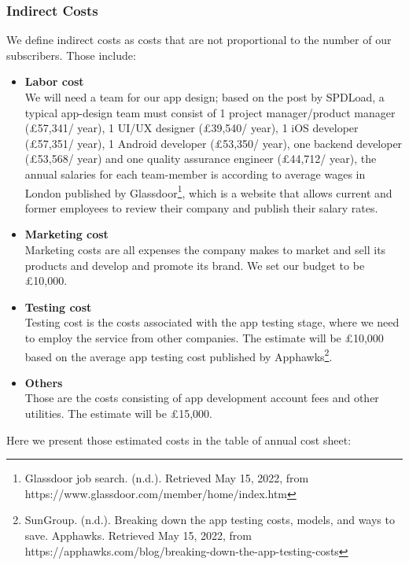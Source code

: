 \subsubsection{Indirect Costs}
We define indirect costs as costs that are not proportional to the number of our subscribers. Those include:
\begin{itemize}
\item \textbf{Labor cost}
\\We will need a team for our app design; based on the post by SPDLoad, a typical app-design team must consist of 1 project manager/product manager (£57,341/ year), 1 UI/UX designer (£39,540/ year), 1 iOS developer (£57,351/ year), 1 Android developer (£53,350/ year), one backend developer (£53,568/ year) and one quality assurance engineer (£44,712/ year), the annual salaries for each team-member is according to average wages in London published by Glassdoor\footnote{Glassdoor job search. (n.d.). Retrieved May 15, 2022, from https://www.glassdoor.com/member/home/index.htm }, which is a website that allows current and former employees to review their company and publish their salary rates.
\item \textbf{Marketing cost}
\\ Marketing costs are all expenses the company makes to market and sell its products and develop and promote its brand. We set our budget to be £10,000.
\item \textbf{Testing cost}
\\ Testing cost is the costs associated with the app testing stage, where we need to employ the service from other companies. The estimate will be £10,000 based on the average app testing cost published by Apphawks\footnote{SunGroup. (n.d.). Breaking down the app testing costs, models, and ways to save. Apphawks. Retrieved May 15, 2022, from https://apphawks.com/blog/breaking-down-the-app-testing-costs }.
\item \textbf{Others}
\\Those are the costs consisting of app development account fees and other utilities. The estimate will be £15,000.
\end{itemize}

Here we present those estimated costs in the table of annual cost sheet:

